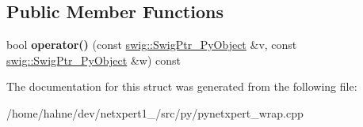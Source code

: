 \subsection*{Public Member Functions}
\begin{DoxyCompactItemize}
\item 
bool {\bfseries operator()} (const \hyperlink{classswig_1_1SwigPtr__PyObject}{swig\+::\+Swig\+Ptr\+\_\+\+Py\+Object} \&v, const \hyperlink{classswig_1_1SwigPtr__PyObject}{swig\+::\+Swig\+Ptr\+\_\+\+Py\+Object} \&w) const \hypertarget{structstd_1_1less_3_01swig_1_1SwigPtr__PyObject_01_4_a72561f398a851c407db5a61a1d672bab}{}\label{structstd_1_1less_3_01swig_1_1SwigPtr__PyObject_01_4_a72561f398a851c407db5a61a1d672bab}

\end{DoxyCompactItemize}


The documentation for this struct was generated from the following file\+:\begin{DoxyCompactItemize}
\item 
/home/hahne/dev/netxpert1\+\_/src/py/pynetxpert\+\_\+wrap.\+cpp\end{DoxyCompactItemize}
